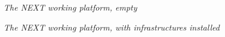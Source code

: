 \begin{figure}[hpt!]
    \bigskip
    \begin{center}\leavevmode
        \caption{\textit{The NEXT working platform, empty}}
        \label{fig:F2:F2}
    \end{center}
\end{figure}

\begin{figure}[hpt!]
    \bigskip
    \begin{center}\leavevmode
        \caption{\textit{The NEXT working platform, with infrastructures installed}}
        \label{fig:F2:F2}
    \end{center}
\end{figure}



